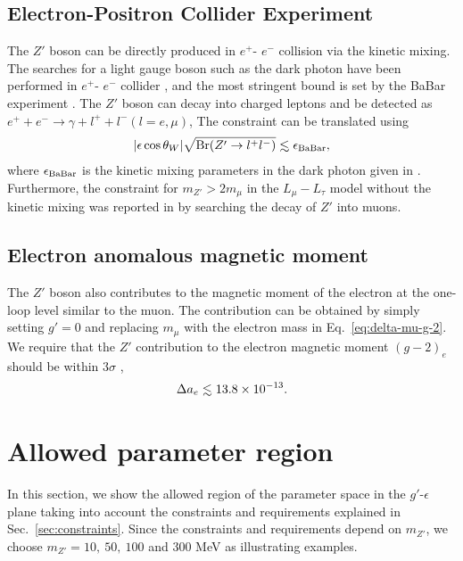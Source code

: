 \documentclass[preprint,amsmath,amssymb,superscriptaddress,nofootinbib]{revtex4}
\newcommand{\lsim}{\raise0.3ex\hbox{$\;<$\kern-0.75em\raise-1.1ex\hbox{$\sim\;$}}}
\begin{document}
\subsection{Electron-Positron Collider Experiment}
The $Z'$ boson can be directly produced in $e^+$- $e^-$ collision via the kinetic mixing. 
The searches for a light gauge boson such as the dark photon have been performed in $e^+$- $e^-$ 
collider \cite{Babusci:2012cr, Babusci:2014sta}, and 
the most stringent bound is set by the BaBar experiment \cite{Lees:2014xha}.
The $Z'$ boson can decay into charged leptons and be detected as $e^+ + e^- \rightarrow \gamma + l^+ + l^-(l=e,\mu)$,
The constraint can be translated using 
\begin{align}
  |\epsilon \cos\theta_W| \sqrt{{\rm Br}(Z'\rightarrow l^+l^-)}
  \lsim
  \epsilon_{\rm BaBar},
\end{align}
where $\epsilon_{\rm BaBar}$ is the kinetic mixing parameters in the dark photon given in \cite{Lees:2014xha}. 
Furthermore, the constraint for $m_{Z'} > 2 m_\mu$ in the $L_\mu - L_\tau$ model without the kinetic mixing 
was reported in \cite{TheBABAR:2016rlg} by searching the decay of $Z'$ into muons. 


\subsection{Electron anomalous magnetic moment}
The $Z'$ boson also contributes to the magnetic moment 
of the electron at the one-loop level similar to the muon. The contribution can be obtained by simply setting  
$g'  = 0$ and replacing $m_\mu$ with the electron mass in Eq.~\eqref{eq:delta-mu-g-2}. 
We require that the $Z'$ contribution to the electron 
magnetic moment $(g-2)_e$ should be within $3\sigma$ \cite{Giudice:2012ms, Aoyama:2014sxa},
\begin{align}
\Delta a_e \lsim 13.8 \times 10^{-13}.
\end{align}



\section{Allowed parameter region} \label{sec:allowed-region}
In this section, we show the allowed region of the parameter space in the $g'$-$\epsilon$ plane taking into account 
the constraints and requirements explained in Sec.~\ref{sec:constraints}. Since the constraints and requirements 
depend on $m_{Z'}$, we choose $m_{Z'} = 10,~50,~100$ and $300$ MeV as illustrating examples. 
\end{document}
